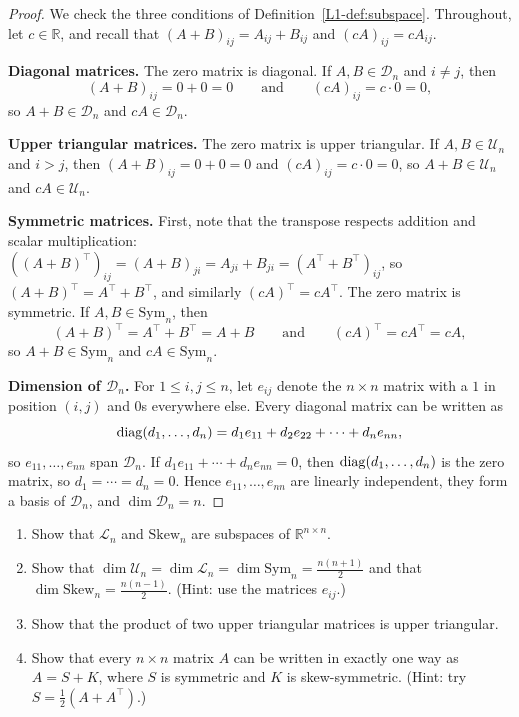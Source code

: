 \begin{proof}
    We check the three conditions of Definition~\ref{L1-def:subspace}. Throughout, let $c \in \mathbb{R}$, and recall that $(A + B)_{ij} = A_{ij} + B_{ij}$ and $(cA)_{ij} = cA_{ij}$.

    \textbf{Diagonal matrices.} The zero matrix is diagonal. If $A, B \in \mathcal{D}_n$ and $i \neq j$, then
    \[(A + B)_{ij} = 0 + 0 = 0 \qquad \text{and} \qquad (cA)_{ij} = c \cdot 0 = 0,\]
    so $A + B \in \mathcal{D}_n$ and $cA \in \mathcal{D}_n$.

    \textbf{Upper triangular matrices.} The zero matrix is upper triangular. If $A, B \in \mathcal{U}_n$ and $i > j$, then $(A + B)_{ij} = 0 + 0 = 0$ and $(cA)_{ij} = c \cdot 0 = 0$, so $A + B \in \mathcal{U}_n$ and $cA \in \mathcal{U}_n$.

    \textbf{Symmetric matrices.} First, note that the transpose respects addition and scalar multiplication: $((A + B)^\top)_{ij} = (A + B)_{ji} = A_{ji} + B_{ji} = (A^\top + B^\top)_{ij}$, so $(A + B)^\top = A^\top + B^\top$, and similarly $(cA)^\top = cA^\top$. The zero matrix is symmetric. If $A, B \in \mathrm{Sym}_n$, then
    \[(A + B)^\top = A^\top + B^\top = A + B \qquad \text{and} \qquad (cA)^\top = cA^\top = cA,\]
    so $A + B \in \mathrm{Sym}_n$ and $cA \in \mathrm{Sym}_n$.

    \textbf{Dimension of $\mathcal{D}_n$.} For $1 \leq i, j \leq n$, let $e_{ij}$ denote the $n \times n$ matrix with a $1$ in position $(i, j)$ and $0$s everywhere else. Every diagonal matrix can be written as
    \[\operatorname{diag}(d_1, \ldots, d_n) = d_1 e_{11} + d_2 e_{22} + \cdots + d_n e_{nn},\]
    so $e_{11}, \ldots, e_{nn}$ span $\mathcal{D}_n$. If $d_1 e_{11} + \cdots + d_n e_{nn} = 0$, then $\operatorname{diag}(d_1, \ldots, d_n)$ is the zero matrix, so $d_1 = \cdots = d_n = 0$. Hence $e_{11}, \ldots, e_{nn}$ are linearly independent, they form a basis of $\mathcal{D}_n$, and $\dim \mathcal{D}_n = n$.
\end{proof}

\begin{exercise}\label{L1-exer:special}
    \begin{enumerate}
        \item Show that $\mathcal{L}_n$ and $\mathrm{Skew}_n$ are subspaces of $\mathbb{R}^{n \times n}$.
        \item Show that $\dim \mathcal{U}_n = \dim \mathcal{L}_n = \dim \mathrm{Sym}_n = \frac{n(n+1)}{2}$ and that $\dim \mathrm{Skew}_n = \frac{n(n-1)}{2}$. (Hint: use the matrices $e_{ij}$.)
        \item Show that the product of two upper triangular matrices is upper triangular.
        \item Show that every $n \times n$ matrix $A$ can be written in exactly one way as $A = S + K$, where $S$ is symmetric and $K$ is skew-symmetric. (Hint: try $S = \frac{1}{2}(A + A^\top)$.)
    \end{enumerate}
\end{exercise}

